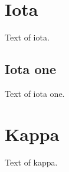 \documentclass{article}
\begin{document}
\tableofcontents
\section{Iota}
Text of iota.
\subsection{Iota one}
Text of iota one.
\section{Kappa}
Text of kappa.
\end{document}
